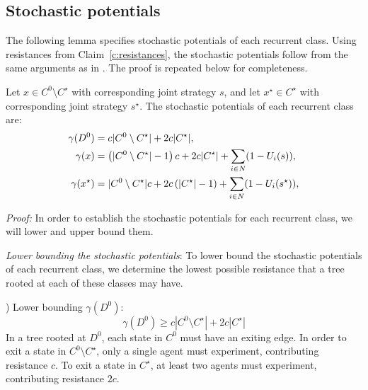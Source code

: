 \subsection{Stochastic potentials}

The following lemma specifies stochastic potentials of each recurrent class. Using resistances from Claim~\ref{c:resistances}, the stochastic potentials follow from the same arguments as in \cite{Marden2013c}. The proof is repeated below for completeness.%

\begin{lemma}\label{l:sps}
Let $x\in C^0\setminus C^\star$ with corresponding joint strategy $s$, and let $x^\star\in C^\star$ with corresponding joint strategy $s^\star.$ The stochastic potentials of each recurrent class are:
\begin{align*}
\gamma(D^0) &= c|C^0\setminus C^\star| + 2c|C^\star|,\\
\gamma(x) &= \left(|C^0\setminus C^\star| - 1\right)c + 2c|C^\star| + \sum_{i\in N}(1 - U_i(\s)),\\
\gamma(x^\star) &= |C^0\setminus C^\star|c + 2c\left(|C^\star|-1\right) + \sum_{i\in N}(1 - U_i(\s^\star)),%
\end{align*}
\end{lemma}

\emph{Proof:}
In order to establish the stochastic potentials for each recurrent class, we will lower and upper bound them.

\noindent\emph{Lower bounding the stochastic potentials}: To lower bound the stochastic potentials of each recurrent class, we determine the lowest possible resistance that a tree rooted at each of these classes may have.

\smallskip
) Lower bounding $\gamma(D^0)$:
$$\gamma(D^0) \geq c|C^0\setminus C^\star| + 2c|C^\star|$$ 
In a tree rooted at $D^0$, each state in $C^0$ must have an exiting edge. In order to exit a state in $C^0\setminus C^\star$, only a single agent must experiment, contributing resistance $c$. To exit a state in $C^\star$, at least two agents must experiment, contributing resistance $2c.$

